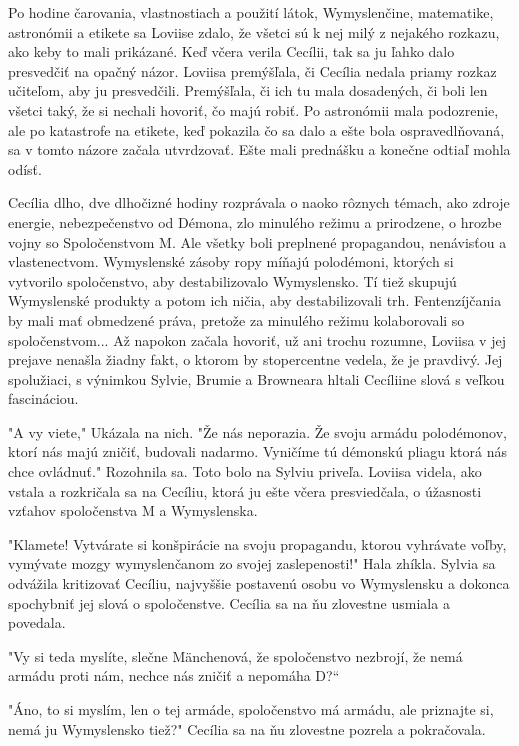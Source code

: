 \documentclass{book}
\begin{document}
Po hodine čarovania, vlastnostiach a použití látok, Wymyslenčine, matematike, astronómii a etikete sa Loviise zdalo, že všetci sú k nej milý z nejakého rozkazu, ako keby to mali prikázané. Keď včera verila Cecílii, tak sa ju ľahko dalo presvedčiť na opačný názor. Loviisa premýšľala, či Cecília nedala priamy rozkaz učiteľom, aby ju presvedčili. Premýšľala, či ich tu mala dosadených, či boli len všetci taký, že si nechali hovoriť, čo majú robiť. Po astronómii mala podozrenie, ale po katastrofe na etikete, keď pokazila čo sa dalo a ešte bola ospravedlňovaná, sa v tomto názore začala utvrdzovať. Ešte mali prednášku a konečne odtiaľ mohla odísť.

Cecília dlho, dve dlhočizné hodiny rozprávala o naoko rôznych témach, ako zdroje energie, nebezpečenstvo od Démona, zlo minulého režimu a prirodzene, o hrozbe vojny so Spoločenstvom M. Ale všetky boli preplnené propagandou, nenávisťou a vlastenectvom. Wymyslenské zásoby ropy míňajú polodémoni, ktorých si vytvorilo spoločenstvo, aby destabilizovalo Wymyslensko. Tí tiež skupujú Wymyslenské produkty a potom ich ničia, aby destabilizovali trh. Fentenzíjčania by mali mať obmedzené práva, pretože za minulého režimu kolaborovali so spoločenstvom... Až napokon začala hovoriť, už ani trochu rozumne, Loviisa v jej prejave nenašla žiadny fakt, o ktorom by stopercentne vedela, že je pravdivý. Jej spolužiaci, s výnimkou Sylvie, Brumie a Browneara hltali Cecíliine slová s veľkou fascináciou.

"$ $A vy viete,"$ $ Ukázala na nich. "$ $Že nás neporazia. Že svoju armádu polodémonov, ktorí nás majú zničiť, budovali nadarmo. Vyničíme tú démonskú pliagu ktorá nás chce ovládnuť."$ $ Rozohnila sa. Toto bolo na Sylviu priveľa. Loviisa videla, ako vstala a rozkričala sa na Cecíliu, ktorá ju ešte včera presviedčala, o úžasnosti vzťahov spoločenstva M a Wymyslenska.

"$ $Klamete! Vytvárate si konšpirácie na svoju propagandu, ktorou vyhrávate voľby, vymývate mozgy wymyslenčanom zo svojej zaslepenosti!"$ $ Hala zhíkla. Sylvia sa odvážila kritizovať Cecíliu, najvyššie postavenú osobu vo Wymyslensku a dokonca spochybniť jej slová o spoločenstve. Cecília sa na ňu zlovestne usmiala a povedala.

"$ $Vy si teda myslíte, slečne Mänchenová, že spoločenstvo nezbrojí, že nemá armádu proti nám, nechce nás zničiť a nepomáha D?“

"$ $Áno, to si myslím, len o tej armáde, spoločenstvo má armádu, ale priznajte si, nemá ju Wymyslensko tiež?"$ $ Cecília sa na ňu zlovestne pozrela a pokračovala.
\end{document}
